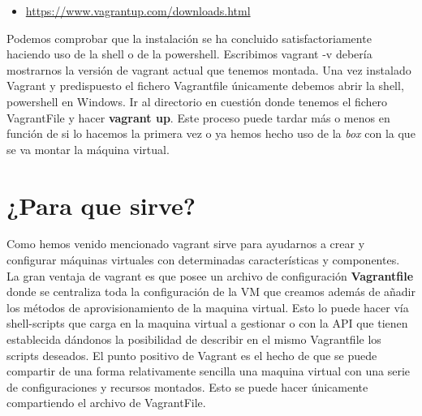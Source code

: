 \begin{itemize}
    \item \url{https://www.vagrantup.com/downloads.html}
\end{itemize}
Podemos comprobar que la instalación se ha concluido satisfactoriamente haciendo uso de la shell o de la powershell. Escribimos vagrant -v debería mostrarnos la versión de vagrant actual que tenemos montada.\newline
\newline
Una vez instalado Vagrant y predispuesto el fichero Vagrantfile únicamente debemos abrir la shell, powershell en Windows. Ir al directorio en cuestión donde tenemos el fichero VagrantFile y hacer \textbf{vagrant up}. Este proceso puede tardar más o menos en función de si lo hacemos la primera vez o ya hemos hecho uso de la \textit{box} con la que se va montar la máquina virtual.

\section{¿Para que sirve?}

Como hemos venido mencionado vagrant sirve para ayudarnos a crear y configurar máquinas virtuales con determinadas características y componentes. La gran ventaja de vagrant es que posee un archivo de configuración \textbf{Vagrantfile} donde se centraliza toda la configuración de la VM que creamos además de añadir los métodos de aprovisionamiento de la maquina virtual.\newline
\newline
Esto lo puede hacer vía shell-scripts que carga en la maquina virtual a gestionar o con la API que tienen establecida dándonos la posibilidad de describir en el mismo Vagrantfile los scripts deseados. El punto positivo de Vagrant es el hecho de que se puede compartir de una forma relativamente sencilla una maquina virtual con una serie de configuraciones y recursos montados. Esto se puede hacer únicamente compartiendo el archivo de VagrantFile.

